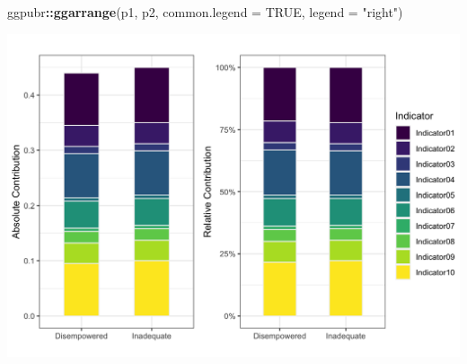 \documentclass[
]{book}
\newenvironment{Shaded}{\begin{snugshade}}{\end{snugshade}}
\newcommand{\DataTypeTok}[1]{\textcolor[rgb]{0.13,0.29,0.53}{#1}}
\newcommand{\KeywordTok}[1]{\textcolor[rgb]{0.13,0.29,0.53}{\textbf{#1}}}
\newcommand{\NormalTok}[1]{#1}
\newcommand{\OperatorTok}[1]{\textcolor[rgb]{0.81,0.36,0.00}{\textbf{#1}}}
\newcommand{\OtherTok}[1]{\textcolor[rgb]{0.56,0.35,0.01}{#1}}
\newcommand{\StringTok}[1]{\textcolor[rgb]{0.31,0.60,0.02}{#1}}
\begin{document}
\begin{Shaded}
\begin{Highlighting}[]
\NormalTok{ggpubr}\OperatorTok{::}\KeywordTok{ggarrange}\NormalTok{(p1, p2, }\DataTypeTok{common.legend =} \OtherTok{TRUE}\NormalTok{, }\DataTypeTok{legend =} \StringTok{"right"}\NormalTok{)}
\end{Highlighting}
\end{Shaded}

\begin{center}\includegraphics[width=0.8\linewidth,height=0.8\textheight]{./_figs/IDX-uncensored1-1} \end{center}

  
\end{document}
